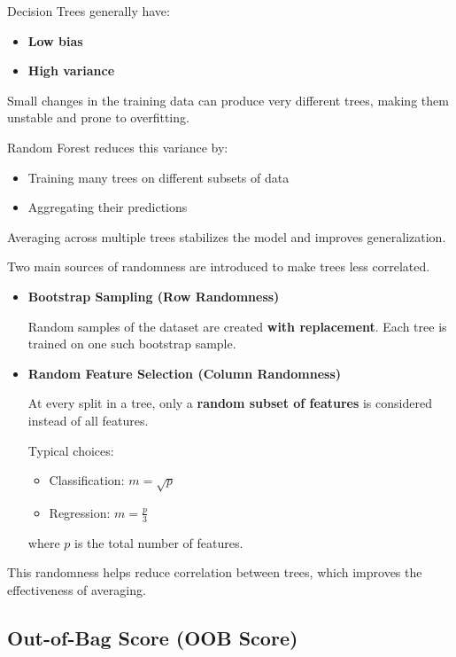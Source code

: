 \documentclass[10pt,a4paper]{article}
\begin{document}
		Decision Trees generally have:
	
		\begin{itemize}
			\item \textbf{Low bias}
			\item \textbf{High variance}
		\end{itemize}
	
		Small changes in the training data can produce very different trees, making them unstable and prone to overfitting.
	
		Random Forest reduces this variance by:
	
		\begin{itemize}
			\item Training many trees on different subsets of data
			\item Aggregating their predictions
		\end{itemize}
	
		Averaging across multiple trees stabilizes the model and improves generalization.

	
		Two main sources of randomness are introduced to make trees less correlated.
	
		\begin{itemize}
			\item \textbf{Bootstrap Sampling (Row Randomness)}
	
			Random samples of the dataset are created \textbf{with replacement}. Each tree is trained on one such bootstrap sample.
	
			\item \textbf{Random Feature Selection (Column Randomness)}
	
			At every split in a tree, only a \textbf{random subset of features} is considered instead of all features.
	
			Typical choices:
	
			\begin{itemize}
				\item Classification: $m = \sqrt{p}$
				\item Regression: $m = \frac{p}{3}$
			\end{itemize}
	
			where $p$ is the total number of features.
		\end{itemize}
	
		This randomness helps reduce correlation between trees, which improves the effectiveness of averaging.
	
	
		\subsection{Out-of-Bag Score (OOB Score)}
	
\end{document}
